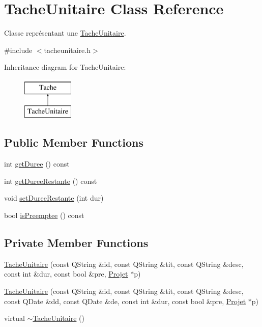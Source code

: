 \hypertarget{class_tache_unitaire}{}\section{Tache\+Unitaire Class Reference}
\label{class_tache_unitaire}


Classe représentant une \hyperlink{class_tache_unitaire}{Tache\+Unitaire}.  




{\ttfamily \#include $<$tacheunitaire.\+h$>$}

Inheritance diagram for Tache\+Unitaire\+:\begin{figure}[H]
\begin{center}
\leavevmode
\includegraphics[height=2.000000cm]{class_tache_unitaire}
\end{center}
\end{figure}
\subsection*{Public Member Functions}
\begin{DoxyCompactItemize}
\item 
int \hyperlink{class_tache_unitaire_a2f1c93887c652e5581df4357bc72949b}{get\+Duree} () const 
\item 
int \hyperlink{class_tache_unitaire_aa9b7e58e61dfded16d5a2508d33734c5}{get\+Duree\+Restante} () const 
\item 
void \hyperlink{class_tache_unitaire_a5b1dc4cb5b374fce9c26abb4c954cef8}{set\+Duree\+Restante} (int dur)
\item 
bool \hyperlink{class_tache_unitaire_a4a25bc2f0b3e6ebd6c0617d22328c986}{is\+Preemptee} () const 
\end{DoxyCompactItemize}
\subsection*{Private Member Functions}
\begin{DoxyCompactItemize}
\item 
\hyperlink{class_tache_unitaire_acca628b1c239bf191fbbf869ad15cdd2}{Tache\+Unitaire} (const Q\+String \&id, const Q\+String \&tit, const Q\+String \&desc, const int \&dur, const bool \&pre, \hyperlink{class_projet}{Projet} $\ast$p)
\item 
\hyperlink{class_tache_unitaire_ab97fdcb6d8d43ff76d46a7ae650eba3d}{Tache\+Unitaire} (const Q\+String \&id, const Q\+String \&tit, const Q\+String \&desc, const Q\+Date \&dd, const Q\+Date \&de, const int \&dur, const bool \&pre, \hyperlink{class_projet}{Projet} $\ast$p)
\item 
virtual \hyperlink{class_tache_unitaire_a54c9937fb3088c48348883ad1b385f8c}{$\sim$\+Tache\+Unitaire} ()
\end{DoxyCompactItemize}
